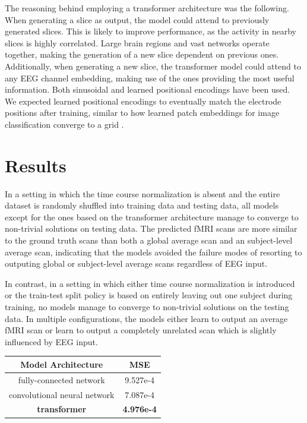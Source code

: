 \documentclass{article}
\begin{document}
The reasoning behind employing a transformer architecture was the following. When generating a slice as output, the model could attend to previously generated slices. This is likely to improve performance, as the activity in nearby slices is highly correlated. Large brain regions and vast networks operate together, making the generation of a new slice dependent on previous ones. Additionally, when generating a new slice, the transformer model could attend to any EEG channel embedding, making use of the ones providing the most useful information. Both sinusoidal and learned positional encodings have been used. We expected learned positional encodings to eventually match the electrode positions after training, similar to how learned patch embeddings for image classification converge to a grid \cite{dosovitskiy_image_2020}.

\section{Results}

In a setting in which the time course normalization is absent and the entire dataset is randomly shuffled into training data and testing data, all models except for the ones based on the transformer architecture manage to converge to non-trivial solutions on testing data. The predicted fMRI scans are more similar to the ground truth scans than both a global average scan and an subject-level  average scan, indicating that the models avoided the failure modes of resorting to outputing global or subject-level average scans regardless of EEG input.

In contrast, in a setting in which either time course normalization is introduced or the train-test split policy is based on entirely leaving out one subject during training, no models manage to converge to non-trivial solutions on the testing data. In multiple configurations, the models either learn to output an average fMRI scan or learn to output a completely unrelated scan which is slightly influenced by EEG input.

\begin{center}
        \begin{tabular}{|c | c|} 
            \hline
            Model Architecture & MSE \\
            \hline
            fully-connected network & 9.527e-4 \\ 
            convolutional neural network & 7.087e-4 \\ 
            \textbf{transformer} & \textbf{4.976e-4} \\ 
            \hline
           \end{tabular}
\end{center}
\end{document}
